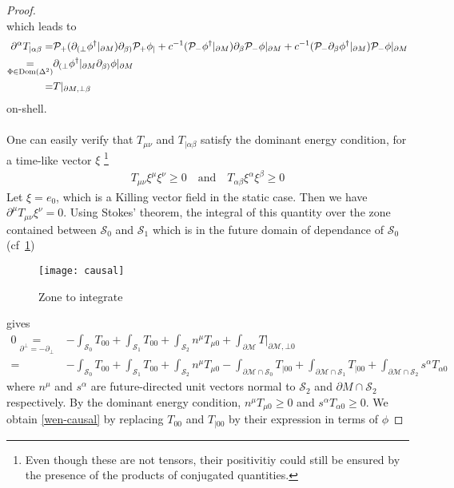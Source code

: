 \begin{proof}
\begin{equation*}
\end{equation*}
which leads to
\begin{equation*}
\begin{split}
\partial^\alpha T_{|\alpha \beta} = & 
 \mathcal{P}_+(\partial_{(\bot} \phi^\dagger\vert_{\partial M})\partial_{\beta)}\mathcal{P}_+ \phi_| + 
c^{-1}(\mathcal{P}_-\phi^\dagger\vert_{\partial M}) \partial_\beta\mathcal{P}_- \phi\vert_{\partial M}
+c^{-1}(\mathcal{P}_-\partial_\beta\phi^\dagger\vert_{\partial M}) \mathcal{P}_- \phi\vert_{\partial M} \\ 
\underset{\Phi \in \mathrm{Dom}(\Delta^2)}{=} & 
\partial_{(\bot}\phi^\dagger\vert_{\partial M} \partial_{\beta)}\phi\vert_{\partial M} \\
= & T\vert_{\partial M,{\bot\beta}}
\end{split}
\end{equation*}
on-shell. \\\\
One can easily verify that $T_{\mu\nu}$ and $T_{| \alpha\beta}$ satisfy the dominant energy condition, \ie for a time-like vector $\xi$ \footnote{
Even though these are not tensors, their positivitiy could still be ensured by the presence of the products of conjugated quantities.
}
\begin{equation*}
\begin{split}
T_{\mu\nu} \xi^\mu \xi^\nu \geq 0 \quad \mathrm{ and }\quad
T_{\alpha\beta} \xi^\alpha \xi^\beta \geq 0 
\end{split}
\end{equation*}
Let $\xi = e_0$, which is a Killing vector field in the static case.
Then we have $\partial^\mu T_{\mu\nu}\xi^\nu = 0$.
Using Stokes' theorem, the integral of this quantity over the zone contained between $\mathcal{S}_0$ and $\mathcal{S}_1$ which is in the future domain of dependance of $\mathcal{S}_0$ (cf~\cref{integratedzone})
%
\begin{figure}[!h]
  \centering
  \texttt{[image: causal]}
  \caption{Zone to integrate}\label{integratedzone}
\end{figure}
%
gives
\begin{equation*}
\begin{split}
0 \underset{\partial^\bot = -\partial_\bot}{=} &
- \int_{\mathcal{S}_0}T_{00} + \int_{\mathcal{S}_1} T_{00} + \int_{\mathcal{S}_2} n^\mu T_{\mu 0} + \int_{\partial \mathcal{M}} T \vert_{\partial \mathcal{M}, \bot 0}   \\
= & - \int_{\mathcal{S}_0} T_{00} + \int_{\mathcal{S}_1} T_{00} + 
 \int_{\mathcal{S}_2} n^\mu T_{\mu 0} -
  \int_{\partial \mathcal{M} \cap \mathcal{S}_0} T_{|00}  +\int_{\partial \mathcal{M} \cap \mathcal{S}_1} T_{|00}
 + \int_{\partial \mathcal{M} \cap \mathcal{S}_2} s^\alpha T_{\alpha 0}
\end{split}
\end{equation*}
where $n^\mu$ and $s^\alpha$ are future-directed unit vectors normal to $\mathcal{S}_2$ and $\partial M \cap \mathcal{S}_2$ respectively.
By the dominant energy condition, 
$n^\mu T_{\mu 0 }\geq 0$ and $s^\alpha T_{\alpha 0 }\geq 0$. 
We obtain \cref{wen-causal} by replacing $T_{00}$ and $T_{| 00}$ by their expression in terms of $\phi$
\end{proof}

